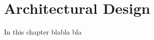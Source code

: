 \documentclass[../dd]{subfiles}
\begin{document}
\chapter{Architectural Design}
\label{architectural_design}

In this chapter blabla bla
\end{document}
